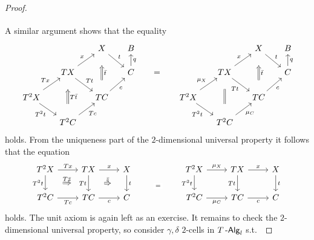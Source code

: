 \documentclass[a4paper,11pt,oneside,openany]{scrbook}
\begin{document}
\begin{proof}
\[\begin{tikzcd}[column sep=5mm, row sep=5mm]
\end{tikzcd}\]
A similar argument shows that the equality
\[\begin{tikzcd}[column sep=5mm, row sep=5mm]
	&& X & B &&&& X & B \\
	& TX && C & {=} && TX && C \\
	{T^2X} && TC && {} & {T^2X} && TC \\
	& {T^2C} &&&&& {T^2C}
	\arrow["Tx", from=3-1, to=2-2]
	\arrow["x", from=2-2, to=1-3]
	\arrow["t", from=1-3, to=2-4]
	\arrow["Tt", from=2-2, to=3-3]
	\arrow["c"', from=3-3, to=2-4]
	\arrow["{T^2t}"', from=3-1, to=4-2]
	\arrow["Tc"', from=4-2, to=3-3]
	\arrow["q"', from=2-4, to=1-4]
	\arrow["{\mu_X}", from=3-6, to=2-7]
	\arrow["x", from=2-7, to=1-8]
	\arrow["t", from=1-8, to=2-9]
	\arrow["Tt"', from=2-7, to=3-8]
	\arrow["c"', from=3-8, to=2-9]
	\arrow["{T^2t}"', from=3-6, to=4-7]
	\arrow["{\mu_C}"', from=4-7, to=3-8]
	\arrow["q"', from=2-9, to=1-9]
	\arrow["{T\bar{t}}"', shorten <=13pt, shorten >=13pt, Rightarrow, from=4-2, to=2-2]
	\arrow["{\bar{t}}"', shorten <=13pt, shorten >=13pt, Rightarrow, from=3-3, to=1-3]
	\arrow["{\bar{t}}"', shorten <=13pt, shorten >=13pt, Rightarrow, from=3-8, to=1-8]
	\arrow[shorten <=13pt, shorten >=13pt, Rightarrow, no head, from=4-7, to=2-7]
\end{tikzcd}\]
holds. From the uniqueness part of the $2$-dimensional universal property it follows that the equation
\[\begin{tikzcd}
	{T^2X} & TX & X & {} & {T^2X} & TX & X \\
	{T^2C} & TC & C & {} & {T^2C} & TC & C
	\arrow["Tx", from=1-1, to=1-2]
	\arrow["x", from=1-2, to=1-3]
	\arrow[""{name=0, anchor=center, inner sep=0}, "t", from=1-3, to=2-3]
	\arrow[""{name=1, anchor=center, inner sep=0}, "Tt"', from=1-2, to=2-2]
	\arrow["c"', from=2-2, to=2-3]
	\arrow[""{name=2, anchor=center, inner sep=0}, "{T^2t}"', from=1-1, to=2-1]
	\arrow["Tc"', from=2-1, to=2-2]
	\arrow["{\mu_X}", from=1-5, to=1-6]
	\arrow["{T^2t}"', from=1-5, to=2-5]
	\arrow["{\mu_C}"', from=2-5, to=2-6]
	\arrow["Tt"', from=1-6, to=2-6]
	\arrow["x", from=1-6, to=1-7]
	\arrow["t", from=1-7, to=2-7]
	\arrow["c"', from=2-6, to=2-7]
	\arrow["{=}"{description}, draw=none, from=1-4, to=2-4]
	\arrow["{T\bar{z}}", shorten <=20pt, shorten >=20pt, Rightarrow, from=2, to=1]
	\arrow["{\bar{z}}", shorten <=18pt, shorten >=18pt, Rightarrow, from=1, to=0]
\end{tikzcd}\]
holds. The unit axiom is again left as an exercise. It remains to check the $2$-dimensional universal property, so consider $\gamma, \delta$ $2$-cells in $T\operatorname{-\mathsf{Alg}}_l$ s.t.\

\end{proof}
\end{document}
